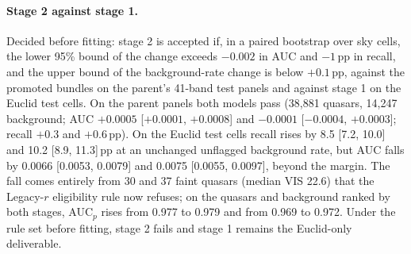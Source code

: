 \documentclass[11pt,a4paper]{article}
\begin{document}
\paragraph{Stage 2 against stage 1.} Decided before fitting: stage 2 is accepted if, in a paired bootstrap over sky
cells, the lower 95\% bound of the change exceeds $-0.002$ in AUC and $-1$\,pp in recall, and the upper bound of
the background-rate change is below $+0.1$\,pp, against the promoted bundles on the parent's 41-band test panels
and against stage 1 on the Euclid test cells. On the parent panels both models pass (38,881 quasars, 14,247
background; AUC $+0.0005$ [$+0.0001$, $+0.0008$] and $-0.0001$ [$-0.0004$, $+0.0003$]; recall $+0.3$ and $+0.6$\,pp).
On the Euclid test cells recall rises by 8.5 [7.2, 10.0] and 10.2 [8.9, 11.3]\,pp at an unchanged unflagged
background rate, but AUC falls by 0.0066 [0.0053, 0.0079] and 0.0075 [0.0055, 0.0097], beyond the margin. The fall
comes entirely from 30 and 37 faint quasars (median VIS 22.6) that the Legacy-$r$ eligibility rule now refuses; on
the quasars and background ranked by both stages, AUC$_p$ rises from 0.977 to 0.979 and from 0.969 to 0.972. Under
the rule set before fitting, stage 2 fails and stage 1 remains the Euclid-only deliverable.

\end{document}
